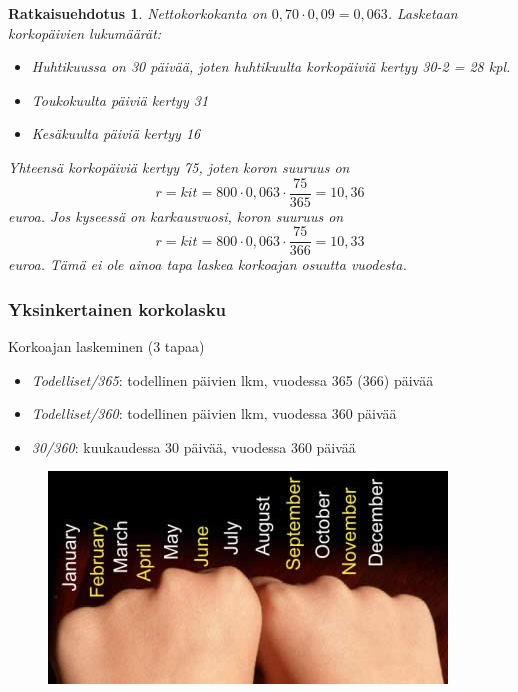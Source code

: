 \documentclass[]{beamer}\usepackage[]{graphicx}\usepackage[]{color}
\newtheorem{ratkaisu}{Ratkaisuehdotus}
\begin{document}
\begin{frame}
    \begin{ratkaisu}
        Nettokorkokanta on \(0,70\cdot0,09 = 0,063\). Lasketaan korkopäivien lukumäärät:\pause
        \begin{itemize}
            \item Huhtikuussa on 30 päivää, joten huhtikuulta korkopäiviä kertyy 30-2 = 28 kpl.\pause
            \item Toukokuulta päiviä kertyy 31\pause
            \item Kesäkuulta päiviä kertyy 16
        \end{itemize}
        Yhteensä korkopäiviä kertyy 75, joten koron suuruus on\pause
        \[
            r = kit = 800\cdot 0,063\cdot \frac{75}{365} = 10,36
        \]
        euroa. \pause Jos kyseessä on karkausvuosi, koron suuruus on
        \[
            r = kit = 800\cdot 0,063\cdot \frac{75}{366} = 10,33
        \]
        euroa. \pause Tämä ei ole ainoa tapa laskea korkoajan osuutta vuodesta.
    \end{ratkaisu}
\end{frame}

\begin{frame}
    \frametitle{Yksinkertainen korkolasku}
    \begin{block}{Korkoajan laskeminen (3 tapaa)}
        \begin{itemize}
            \item \emph{Todelliset/365}: todellinen päivien lkm, vuodessa 365 (366) päivää
            \item \emph{Todelliset/360}: todellinen päivien lkm, vuodessa 360 päivää
            \item \emph{30/360}: kuukaudessa 30 päivää, vuodessa 360 päivää
        \end{itemize}
    \end{block}
    \pause
    \begin{figure}
        \includegraphics[scale=0.7]{months}
    \end{figure}
\end{frame}
\end{document}
